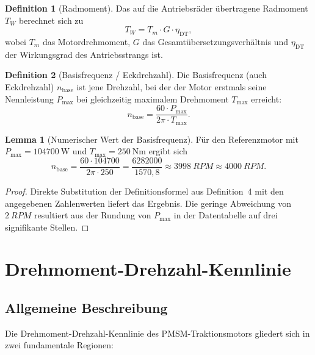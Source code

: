 ﻿\documentclass[a4paper,12pt]{article}
\theoremstyle{definition}
\newtheorem{definition}{Definition}
\newtheorem{lemma}{Lemma}
\begin{document}
\begin{definition}[Radmoment]
    Das auf die Antriebsräder übertragene Radmoment $T_W$ berechnet sich zu
    \[
        T_W = T_m \cdot G \cdot \eta_{\mathrm{DT}},
    \]
    wobei $T_m$ das Motordrehmoment, $G$ das Gesamtübersetzungsverhältnis und
    $\eta_{\mathrm{DT}}$ der Wirkungsgrad des Antriebsstrangs ist.
\end{definition}

\begin{definition}[Basisfrequenz / Eckdrehzahl]
    Die Basisfrequenz (auch Eckdrehzahl) $n_{\mathrm{base}}$ ist jene Drehzahl,
    bei der der Motor erstmals seine Nennleistung $P_{\max}$ bei gleichzeitig maximalem
    Drehmoment $T_{\max}$ erreicht:
    \[
        n_{\mathrm{base}} = \frac{60 \cdot P_{\max}}{2\pi \cdot T_{\max}}.
    \]
\end{definition}

\begin{lemma}[Numerischer Wert der Basisfrequenz]
\label{lem:nbase}
    Für den Referenzmotor mit $P_{\max} = \SI{104700}{\watt}$ und
    $T_{\max} = \SI{250}{\newton\metre}$ ergibt sich
    \[
        n_{\mathrm{base}}
        = \frac{60 \cdot 104700}{2\pi \cdot 250}
        = \frac{6282000}{1570{,}8}
        \approx \SI{3998}{RPM} \approx \SI{4000}{RPM}.
    \]
\end{lemma}

\begin{proof}
    Direkte Substitution der Definitionsformel aus Definition~4 mit den
    angegebenen Zahlenwerten liefert das Ergebnis. Die geringe Abweichung von
    $\SI{2}{RPM}$ resultiert aus der Rundung von $P_{\max}$ in der Datentabelle
    auf drei signifikante Stellen.
\end{proof}

\section{Drehmoment-Drehzahl-Kennlinie}
\label{sec:kennlinie}

\subsection{Allgemeine Beschreibung}

Die Drehmoment-Drehzahl-Kennlinie des PMSM-Traktionsmotors gliedert sich in
zwei fundamentale Regionen:
\end{document}

